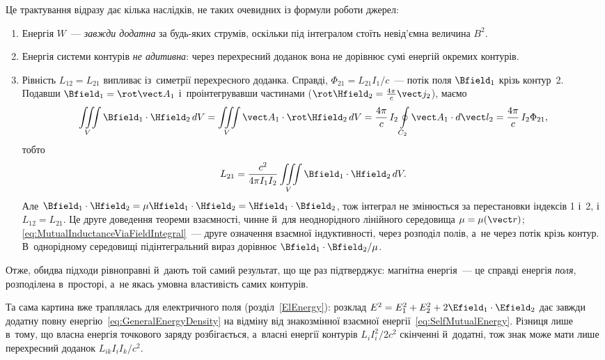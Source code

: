 Це трактування відразу дає кілька наслідків, не таких очевидних із формули роботи джерел:
\begin{enumerate}
	\item Енергія $W$~--- \emph{завжди додатна} за будь-яких струмів, оскільки під
	  інтегралом стоїть невід'ємна величина $B^2$.
	\item Енергія системи контурів \emph{не адитивна}: через перехресний доданок вона не
	  дорівнює сумі енергій окремих контурів.
	\item Рівність $L_{12}=L_{21}$ випливає із~симетрії перехресного доданка. Справді, $\Phi_{21}=L_{21}I_1/c$~--- потік поля $\Bfield_1$ крізь контур~2. Подавши $\Bfield_1=\rot\vect A_1$ і~проінтегрувавши частинами ($\rot\Hfield_2=\frac{4\pi}{c}\vect j_2$), маємо
	\begin{equation*}
		\iiint\limits_V \Bfield_1\cdot\Hfield_2\,dV=\iiint\limits_V \vect A_1\cdot\rot\Hfield_2\,dV
		=\frac{4\pi}{c}\,I_2\oint\limits_{C_2}\vect A_1\cdot d\vect l_2=\frac{4\pi}{c}\,I_2\Phi_{21},
	\end{equation*}
	тобто
	\begin{equation}\label{eq:MutualInductanceViaFieldIntegral}
		L_{21}=\frac{c^2}{4\pi I_1I_2}\iiint\limits_V \Bfield_1\cdot\Hfield_2\,dV.
	\end{equation}
	Але $\Bfield_1\cdot\Hfield_2=\mu\Hfield_1\cdot\Hfield_2=\Hfield_1\cdot\Bfield_2$, тож інтеграл не змінюється за перестановки індексів 1 і~2, і~$L_{12}=L_{21}$. Це друге доведення теореми взаємності, чинне й~для неоднорідного лінійного середовища $\mu=\mu(\vect r)$; \eqref{eq:MutualInductanceViaFieldIntegral}~--- друге означення взаємної індуктивності, через розподіл полів, а~не через потік крізь контур. В~однорідному середовищі підінтегральний вираз дорівнює $\Bfield_1\cdot\Bfield_2/\mu$.
\end{enumerate}
Отже, обидва підходи рівноправні й~дають той самий результат, що ще раз підтверджує:
магнітна енергія~--- це справді енергія \emph{поля}, розподілена в~просторі, а~не якась
умовна властивість самих контурів.

Та сама картина вже траплялась для електричного поля (розділ~\ref{ElEnergy}): розклад $E^2=E_1^2+E_2^2+2\Efield_1\cdot\Efield_2$ дає завжди додатну повну енергію~\eqref{eq:GeneralEnergyDensity} на відміну від знакозмінної взаємної енергії~\eqref{eq:SelfMutualEnergy}. Різниця лише в~тому, що власна енергія точкового заряду розбігається, а~власні енергії контурів $L_iI_i^2/2c^2$ скінченні й~додатні, тож знак може мати лише перехресний доданок $L_{ik}I_iI_k/c^2$.




